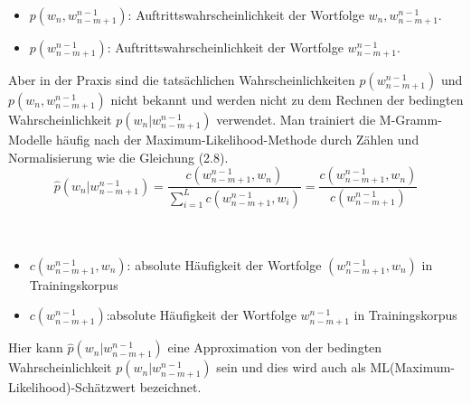 \begin{itemize}
	\item $p(w_{n},w_{n-m+1}^{n-1})$: Auftrittswahrscheinlichkeit der Wortfolge $w_{n},w_{n-m+1}^{n-1}$.\\
	\item $p(w_{n-m+1}^{n-1})$: Auftrittswahrscheinlichkeit der Wortfolge $w_{n-m+1}^{n-1}$.
\end{itemize}

Aber in der Praxis sind die tats\"achlichen Wahrscheinlichkeiten $p(w_{n-m+1}^{n-1})$  und \\ $p(w_{n},w_{n-m+1}^{n-1})$ nicht bekannt und werden nicht zu dem Rechnen der bedingten Wahrscheinlichkeit $p(w_{n}|w_{n-m+1}^{n-1})$ verwendet. Man trainiert die M-Gramm-Modelle h\"aufig nach der Maximum-Likelihood-Methode \cite{int_MLE} durch Z\"ahlen und Normalisierung wie die Gleichung (2.8). 
\begin{equation}
\hat{p}(w_{n}|w_{n-m+1}^{n-1})=\frac{c(w_{n-m+1}^{n-1},w_{n} )}{ \sum_{i=1}^L c(w_{n-m+1}^{n-1},w_{i})}=\frac{c(w_{n-m+1}^{n-1},w_{n} )}{c(w_{n-m+1}^{n-1})}
\end{equation}
\\
\\
\begin{itemize}
	\item $c(w_{n-m+1}^{n-1},w_{n})$: absolute H\"aufigkeit der Wortfolge $(w_{n-m+1}^{n-1},w_{n})$ in Trainingskorpus\\
	\item $c(w_{n-m+1}^{n-1})$:absolute H\"aufigkeit der Wortfolge $w_{n-m+1}^{n-1}$ in Trainingskorpus\\
\end{itemize}
Hier kann $\hat{p}(w_{n}|w_{n-m+1}^{n-1})$  eine Approximation von der bedingten Wahrscheinlichkeit $p(w_{n}|w_{n-m+1}^{n-1})$ sein und dies wird auch als ML(Maximum-Likelihood)-Sch\"atzwert bezeichnet.\\

